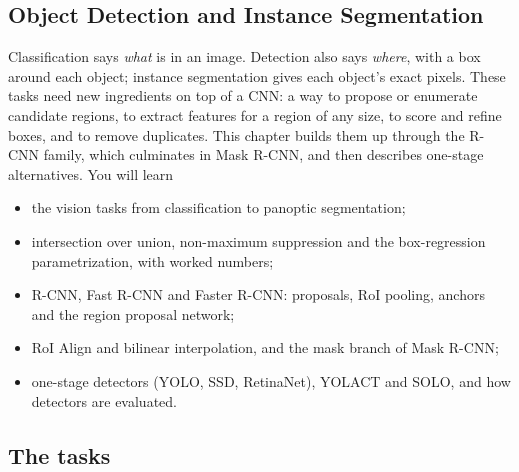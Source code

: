 \begin{notechapter}
\chapter{Object Detection and Instance Segmentation}\label{ch:detection-segmentation}

\begin{chapterintro}
Classification says \emph{what} is in an image. Detection also says \emph{where}, with a box around
each object; instance segmentation gives each object's exact pixels. These tasks need
new ingredients on top of a CNN: a way to propose or enumerate candidate regions, to
extract features for a region of any size, to score and refine boxes, and to remove
duplicates. This chapter builds them up through the R-CNN family, which culminates in
Mask R-CNN, and then describes one-stage alternatives. You will learn
\begin{itemize}[nosep]
  \item the vision tasks from classification to panoptic segmentation;
  \item intersection over union, non-maximum suppression and the box-regression
        parametrization, with worked numbers;
  \item R-CNN, Fast R-CNN and Faster R-CNN: proposals, RoI pooling, anchors and the region
        proposal network;
  \item RoI Align and bilinear interpolation, and the mask branch of Mask R-CNN;
  \item one-stage detectors (YOLO, SSD, RetinaNet), YOLACT and SOLO, and how detectors are
        evaluated.
\end{itemize}
\end{chapterintro}

\section{The tasks}\label{detection-segmentation:sec:tasks}


\end{notechapter}
